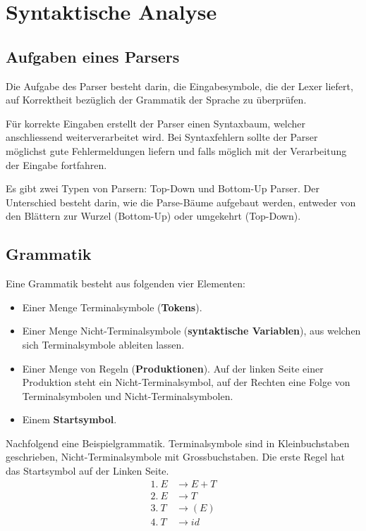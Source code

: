\section{Syntaktische Analyse}


\subsection{Aufgaben eines Parsers}

Die Aufgabe des Parser besteht darin, die Eingabesymbole, die der Lexer liefert,
auf Korrektheit bezüglich der Grammatik der Sprache zu überprüfen.

Für korrekte Eingaben erstellt der Parser einen Syntaxbaum, welcher
anschliessend weiterverarbeitet wird. Bei Syntaxfehlern sollte der Parser
möglichst gute Fehlermeldungen liefern und falls möglich mit der Verarbeitung
der Eingabe fortfahren.

Es gibt zwei Typen von Parsern: Top-Down und Bottom-Up Parser. Der Unterschied
besteht darin, wie die Parse-Bäume aufgebaut werden, entweder von den Blättern
zur Wurzel (Bottom-Up) oder umgekehrt (Top-Down).


\subsection{Grammatik}

Eine Grammatik besteht aus folgenden vier Elementen:

\begin{itemize}
	\item Einer Menge Terminalsymbole (\textbf{Tokens}).
	\item Einer Menge Nicht-Terminalsymbole (\textbf{syntaktische Variablen}), aus
		welchen sich Terminalsymbole ableiten lassen.
	\item Einer Menge von Regeln (\textbf{Produktionen}). Auf der linken Seite
		einer Produktion steht ein Nicht-Terminalsymbol, auf der Rechten eine Folge
		von Terminalsymbolen und Nicht-Terminalsymbolen.
	\item Einem \textbf{Startsymbol}.
\end{itemize}

Nachfolgend eine Beispielgrammatik. Terminalsymbole sind in Kleinbuchstaben
geschrieben, Nicht-Terminalsymbole mit Grossbuchstaben. Die erste Regel hat das
Startsymbol auf der Linken Seite.
%
\begin{align*}
	1.~E &\rightarrow E + T \\
	2.~E &\rightarrow T \\
	3.~T &\rightarrow (E) \\
	4.~T &\rightarrow id
\end{align*}


